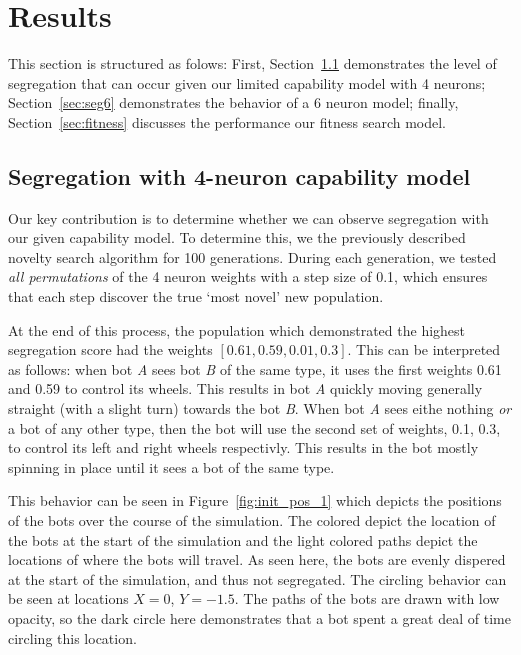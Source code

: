 \section{Results}
\label{sec:res}

This section is structured as folows: First, Section~\ref{sec:seg4} demonstrates the level of segregation that can occur given our limited capability model with 4 neurons; Section~\ref{sec:seg6} demonstrates the behavior of a 6 neuron model; finally, Section~\ref{sec:fitness} discusses the performance our fitness search model. 


\subsection{Segregation with 4-neuron capability model}
\label{sec:seg4}

Our key contribution is to determine whether we can observe segregation with our given capability model. 
To determine this, we the previously described novelty search algorithm for 100 generations.
During each generation, we tested \emph{all permutations} of the 4 neuron weights with a step size of 0.1, which ensures that each step discover the true `most novel' new population.

At the end of this process, the population which demonstrated the highest segregation score had the weights $[0.61, 0.59, 0.01, 0.3]$. 
This can be interpreted as follows: when bot \emph{A} sees bot \emph{B} of the same type, it uses the first weights 0.61 and 0.59 to control its wheels.
This results in bot \emph{A} quickly moving generally straight (with a slight turn) towards the bot \emph{B}. 
When bot \emph{A} sees eithe nothing \emph{or} a bot of any other type, then the bot will use the second set of weights, 0.1, 0.3, to control its left and right wheels respectivly. 
This results in the bot mostly spinning in place until it sees a bot of the same type. 

This behavior can be seen in Figure~\ref{fig:init_pos_1} which depicts the positions of the bots over the course of the simulation. 
The colored depict the location of the bots at the start of the simulation and the light colored paths depict the locations of where the bots will travel. 
As seen here, the bots are evenly dispered at the start of the simulation, and thus not segregated.
The circling behavior can be seen at locations $X= 0$, $Y= -1.5$. 
The paths of the bots are drawn with low opacity, so the dark circle here demonstrates that a bot spent a great deal of time circling this location. 



